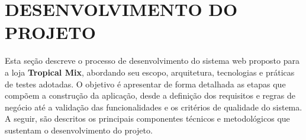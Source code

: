 \chapter{DESENVOLVIMENTO DO PROJETO}
Esta seção descreve o processo de desenvolvimento do sistema web proposto para a loja \textbf{Tropical Mix}, abordando seu escopo, arquitetura, tecnologias e práticas de testes adotadas. O objetivo é apresentar de forma detalhada as etapas que compõem a construção da aplicação, desde a definição dos requisitos e regras de negócio até a validação das funcionalidades e os critérios de qualidade do sistema. A seguir, são descritos os principais componentes técnicos e metodológicos que sustentam o desenvolvimento do projeto.

%









